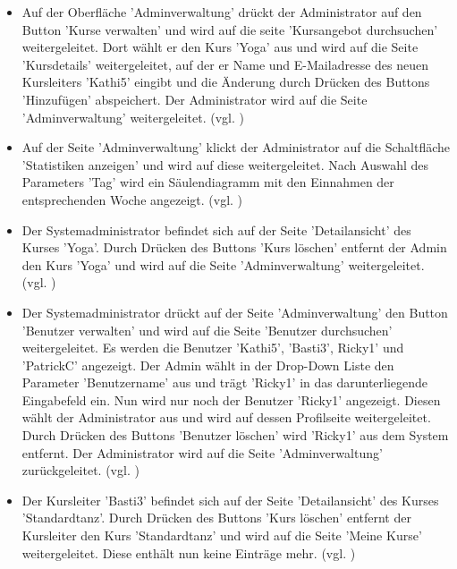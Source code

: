 \documentclass[a4paper]{scrreprt}
\begin{document}
\begin{itemize}
				\item {}
				Auf der Oberfläche 'Adminverwaltung' drückt der Administrator auf den Button 'Kurse verwalten' und wird auf die seite 'Kursangebot durchsuchen' weitergeleitet. Dort wählt er den Kurs 'Yoga' aus und wird auf die Seite 'Kursdetails' weitergeleitet, auf der er Name und E-Mailadresse des neuen Kursleiters 'Kathi5' eingibt und die Änderung durch Drücken des Buttons 'Hinzufügen' abspeichert. Der Administrator wird auf die Seite 'Adminverwaltung' weitergeleitet. (vgl. )
				
				\item {}
				Auf der Seite 'Adminverwaltung' klickt der Administrator auf die Schaltfläche 'Statistiken anzeigen' und wird auf diese weitergeleitet. Nach Auswahl des Parameters 'Tag' wird ein Säulendiagramm mit den Einnahmen der entsprechenden Woche angezeigt. (vgl. )
				
				\item {}
				Der Systemadministrator befindet sich auf der Seite 'Detailansicht' des Kurses 'Yoga'. Durch Drücken des Buttons 'Kurs löschen' entfernt der Admin den Kurs 'Yoga' und wird auf die Seite 'Adminverwaltung' weitergeleitet. (vgl. )
				
				\item {}
				Der Systemadministrator drückt auf der Seite 'Adminverwaltung' den Button 'Benutzer verwalten' und wird auf die Seite 'Benutzer durchsuchen' weitergeleitet. Es werden die Benutzer 'Kathi5', 'Basti3', Ricky1' und 'PatrickC' angezeigt. Der Admin wählt in der Drop-Down Liste den Parameter 'Benutzername' aus und trägt 'Ricky1' in das darunterliegende Eingabefeld ein. Nun wird nur noch der Benutzer 'Ricky1' angezeigt. Diesen wählt der Administrator aus und wird auf dessen Profilseite weitergeleitet. Durch Drücken des Buttons 'Benutzer löschen' wird 'Ricky1' aus dem System entfernt. Der Administrator wird auf die Seite 'Adminverwaltung' zurückgeleitet. (vgl. )
				
				\item {}
				Der Kursleiter 'Basti3' befindet sich auf der Seite 'Detailansicht' des Kurses 'Standardtanz'. Durch Drücken des Buttons 'Kurs löschen' entfernt der Kursleiter den Kurs 'Standardtanz' und wird auf die Seite 'Meine Kurse' weitergeleitet. Diese enthält nun keine Einträge mehr. (vgl. )
				
			\end{itemize}
\end{document}
